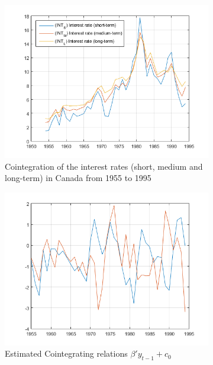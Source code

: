 \documentclass[11pt,a4,twosided,singlespacing,titlepagenumber=on]{scrreprt}
\numberwithin{equation}{chapter} %
\theoremstyle{remark}
\begin{document}
\begin{figure}[H]
    \centering
    \begin{subfigure}[t]{0.49\textwidth}
        \centering
        \includegraphics[width=1\textwidth]{TestMultipleSeriesForCointegrationUsingJcitestExample_01}
        \caption{Cointegration of the interest rates (short, medium and long-term) in Canada from 1955 to 1995}
        \label{TestMultipleSeriesForCointegrationUsingJcitestExample_01}
    \end{subfigure}
    \begin{subfigure}[t]{0.49\textwidth}
        \centering
        \includegraphics[width=1\textwidth]{TestMultipleSeriesForCointegrationUsingJcitestExample_02}
        \caption{Estimated Cointegrating relations $\beta' y_{t-1} + c_0$}
        \label{TestMultipleSeriesForCointegrationUsingJcitestExample_02}
    \end{subfigure}
    \caption{}
\end{figure}
\end{document}
